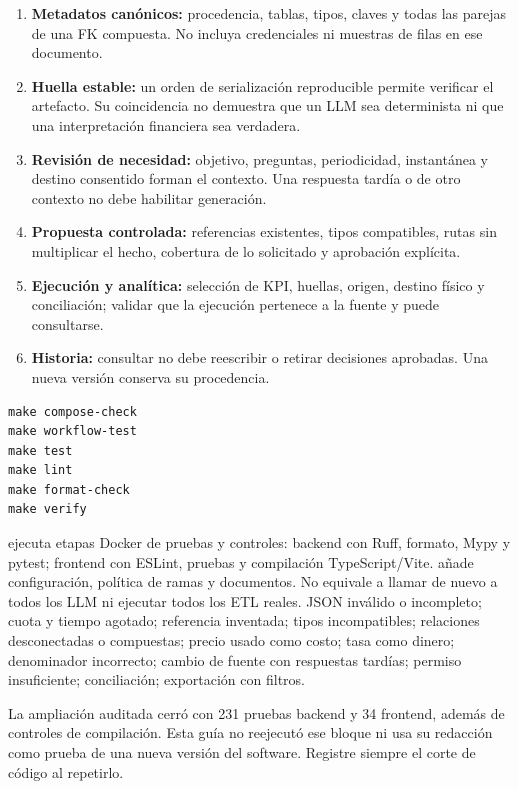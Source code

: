 \begin{enumerate}
\item \textbf{Metadatos canónicos:} procedencia, tablas, tipos, claves y todas las parejas de una FK compuesta. No incluya credenciales ni muestras de filas en ese documento.
\item \textbf{Huella estable:} un orden de serialización reproducible permite verificar el artefacto. Su coincidencia no demuestra que un LLM sea determinista ni que una interpretación financiera sea verdadera.
\item \textbf{Revisión de necesidad:} objetivo, preguntas, periodicidad, instantánea y destino consentido forman el contexto. Una respuesta tardía o de otro contexto no debe habilitar generación.
\item \textbf{Propuesta controlada:} referencias existentes, tipos compatibles, rutas sin multiplicar el hecho, cobertura de lo solicitado y aprobación explícita.
\item \textbf{Ejecución y analítica:} selección de KPI, huellas, origen, destino físico y conciliación; validar que la ejecución pertenece a la fuente y puede consultarse.
\item \textbf{Historia:} consultar no debe reescribir o retirar decisiones aprobadas. Una nueva versión conserva su procedencia.
\end{enumerate}
\begin{verbatim}
make compose-check
make workflow-test
make test
make lint
make format-check
make verify
\end{verbatim}
 ejecuta etapas Docker de pruebas y controles: backend con Ruff, formato, Mypy y pytest; frontend con ESLint, pruebas y compilación TypeScript/Vite.  añade configuración, política de ramas y documentos. No equivale a llamar de nuevo a todos los LLM ni ejecutar todos los ETL reales.
JSON inválido o incompleto; cuota y tiempo agotado; referencia inventada; tipos incompatibles; relaciones desconectadas o compuestas; precio usado como costo; tasa como dinero; denominador incorrecto; cambio de fuente con respuestas tardías; permiso insuficiente; conciliación; exportación con filtros.
\begin{good}
La ampliación auditada cerró con 231 pruebas backend y 34 frontend, además de controles de compilación. Esta guía no reejecutó ese bloque ni usa su redacción como prueba de una nueva versión del software. Registre siempre el corte de código al repetirlo.
\end{good}

